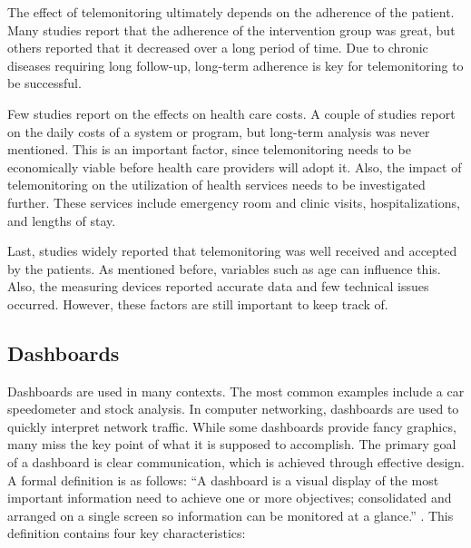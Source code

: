         The effect of telemonitoring ultimately depends on the adherence of the patient. Many studies report that the adherence of the intervention group was great, but others reported that it decreased over a long period of time. Due to chronic diseases requiring long follow-up, long-term adherence is key for telemonitoring to be successful. 

        Few studies report on the effects on health care costs. A couple of studies report on the daily costs of a system or program, but long-term analysis was never mentioned. This is an important factor, since telemonitoring needs to be economically viable before health care providers will adopt it. Also, the impact of telemonitoring on the utilization of health services needs to be investigated further. These services include emergency room and clinic visits, hospitalizations, and lengths of stay. 
        
        Last, studies widely reported that telemonitoring was well received and accepted by the patients. As mentioned before, variables such as age can influence this. Also, the measuring devices reported accurate data and few technical issues occurred. However, these factors are still important to keep track of.

    \subsection{Dashboards} \label{2_dashboards}

    Dashboards are used in many contexts. The most common examples include a car speedometer and stock analysis. In computer networking, dashboards are used to quickly interpret network traffic.  While some dashboards provide fancy graphics, many miss the key point of what it is supposed to accomplish. The primary goal of a dashboard is clear communication, which is achieved through effective design. A formal definition is as follows: ``A dashboard is a visual display of the most important information need to achieve one or more objectives; consolidated and arranged on a single screen so information can be monitored at a glance.'' \cite{dashboard}. This definition contains four key characteristics:

